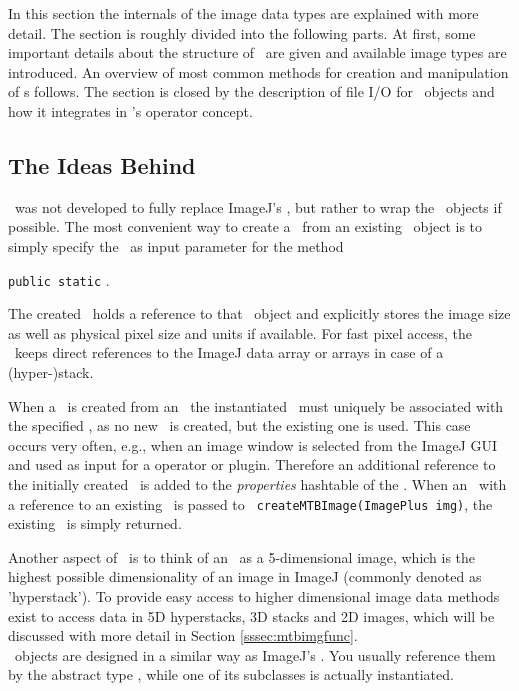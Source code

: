 In this section the internals of the \mitobo image data types are explained with more detail. The section is 
roughly divided into the following parts. At
first, some important details about the structure of \mtbimg~are given and available
image types are introduced. An overview of most common methods
for creation and manipulation of \mtbimg s follows. The section is closed
by the description of file I/O for \mtbimg~objects and how it integrates in \mitobo's
operator concept.

\subsection{The Ideas Behind \mtbimg}
\mtbimg~was not developed to fully replace ImageJ's 
\imgplus, but rather to wrap the \imgplus~objects if possible.
The most convenient way to create
a \mtbimg~from an existing \imgplus~object is to simply specify the \imgplus~as input parameter for the
method 
\centerline{\texttt{public static} .}
The created \mtbimg~holds a reference to that \imgplus~object and explicitly stores the
image size as well as physical pixel size and units if available. For fast pixel
access, the \mtbimg~keeps direct references to the ImageJ data array or arrays in case
of a (hyper-)stack.

When a \mtbimg~is created from an \imgplus~the instantiated \mtbimg~must uniquely be
associated with the specified \imgplus, as no new \imgplus~is
created, but the existing one is used. This case occurs very often, e.g., when an
image window is selected from the ImageJ GUI and used as input for a \mitobo operator or plugin. 
Therefore an additional reference to the initially created \mtbimg~is added to the \textit{properties}
hashtable of the \imgplus. When an
\imgplus~with a reference to an existing \mtbimg~is passed to {\tt
createMTBImage(ImagePlus img)}, the existing \mtbimg~is simply returned.

Another aspect of \mtbimg~is to think of an \imgplus~as a 5-dimensional
image, which is the highest possible dimensionality of an image in ImageJ
(commonly denoted as 'hyperstack'). To provide easy access to higher dimensional image data
methods exist to access data in 5D hyperstacks, 3D stacks and 2D images,
which will be discussed with more detail in Section \ref{sssec:mtbimgfunc}.\\ 
\mtbimg~objects are designed in a similar way as ImageJ's \imgproc. You usually reference 
them by the abstract type \mtbimg, while one of its subclasses is actually instantiated.


